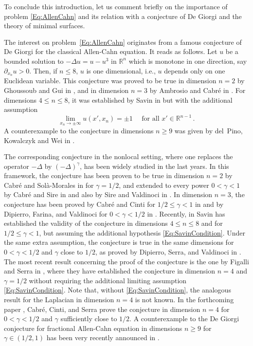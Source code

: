 \documentclass[12pt,reqno]{amsart}
\theoremstyle{definition}
\theoremstyle{remark}
\newcommand{\con}[1]{\mathbb{#1}}
\newcommand{\R}{\con{R}} %
\newcommand{\s}{\gamma}
\newcommand{\fraclaplacian}{(-\Delta)^\s}
\numberwithin{equation}{section}
\begin{document}
To conclude this introduction, let us comment briefly on the importance of problem \eqref{Eq:AllenCahn} and its relation with a conjecture of De Giorgi and the theory of minimal surfaces.

The interest on problem~\eqref{Eq:AllenCahn} originates from a famous conjecture of De Giorgi for the classical Allen-Cahn equation. It reads as follows. Let $u$ be a bounded solution to $-\Delta  u = u - u^3 $ in $\R^n$ which is monotone in one direction, say $\partial_{x_n} u > 0$. Then, if $n\leq 8$, $u$ is one dimensional, i.e., $u$ depends only on one Euclidean variable. This conjecture was proved to be true in dimension $n=2$ by Ghoussoub and Gui in \cite{GhoussoubGui}, and in dimension $n=3$ by Ambrosio and Cabré in \cite{AmbrosioCabre}. For dimensions $4\leq n \leq 8$, it was established by Savin in \cite{Savin-DeGiorgi} but with the additional assumption 
\begin{equation}
\label{Eq:SavinCondition}
	\lim_{x_n \to \pm \infty} u(x',x_n) = \pm 1 \quad \text{ for all } x'\in \R^{n-1}\,.
\end{equation}
A counterexample to the conjecture in dimensions $n \geq 9$ was given by del~Pino, Kowalczyk and Wei in \cite{delPinoKowalczykWei}. 

The corresponding conjecture in the nonlocal setting, where one replaces the operator $-\Delta$ by $\fraclaplacian$, has been widely studied in the last years. In this framework, the conjecture has been proven to be true in dimension $n=2$ by Cabré and Solà-Morales in \cite{CabreSolaMorales} for $\s=1/2$, and extended to every power $0<\s<1$ by Cabré and Sire in \cite{CabreSireII} and also by Sire and Valdinoci in \cite{SireValdinoci}. In dimension $n=3$, the conjecture has been proved by Cabré and Cinti for $1/2 \leq \s < 1$ in \cite{CabreCinti-EnergyHalfL, CabreCinti-SharpEnergy} and by Dipierro, Farina, and Valdinoci for $0<\s<1/2$ in \cite{DipierroFarinaValdinoci}. Recently, in \cite{Savin-Fractional,Savin-Fractional2} Savin has established the validity of the conjecture in dimensions $4\leq n \leq 8$ and for $1/2 \leq \s < 1$, but assuming the additional hypothesis \eqref{Eq:SavinCondition}. Under the same extra assumption, the conjecture is true in the same dimensions for $0<\s<1/2$ and $\s$ close to $1/2$, as proved by Dipierro, Serra, and Valdinoci in \cite{DipierroSerraValdinoci}. The most recent result concerning the proof of the conjecture is the one by Figalli and Serra in \cite{FigalliSerra}, where they have established the conjecture in dimension $n=4$ and $\s=1/2$ without requiring the additional limiting assumption \eqref{Eq:SavinCondition}. Note that, without \eqref{Eq:SavinCondition}, the analogous result for the Laplacian in dimension $n=4$ is not known. In the forthcoming paper \cite{CabreCintiSerra-Stable}, Cabré, Cinti, and Serra prove the conjecture in dimension $n=4$ for $0<\s<1/2$ and $\s$ sufficiently close to $1/2$. A counterexample to the De Giorgi conjecture for fractional Allen-Cahn equation in dimensions $n \geq 9$ for $\s \in ( 1/2 , 1)$ has been very recently announced in \cite{ChanLiuWei}.
\end{document}
